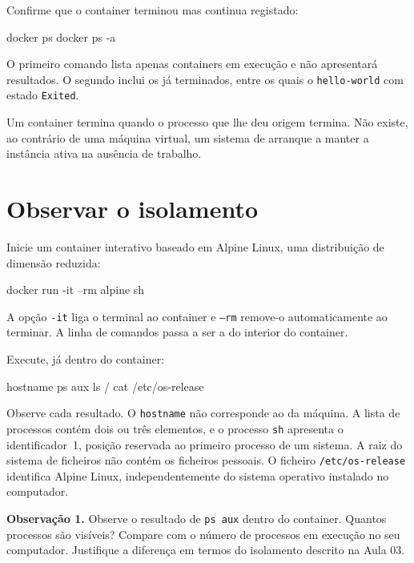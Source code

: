 \documentclass[11pt,a4paper]{article}
\begin{document}
Confirme que o container terminou mas continua registado:

\begin{terminal}
docker ps
docker ps -a
\end{terminal}

O primeiro comando lista apenas containers em execução e não apresentará resultados. O segundo inclui os já terminados, entre os quais o \texttt{hello-world} com estado \texttt{Exited}.

\begin{nota}
Um container termina quando o processo que lhe deu origem termina. Não existe, ao contrário de uma máquina virtual, um sistema de arranque a manter a instância ativa na ausência de trabalho.
\end{nota}

\section{Observar o isolamento}

Inicie um container interativo baseado em Alpine Linux, uma distribuição de dimensão reduzida:

\begin{terminal}
docker run -it --rm alpine sh
\end{terminal}

A opção \texttt{-it} liga o terminal ao container e \texttt{--rm} remove-o automaticamente ao terminar. A linha de comandos passa a ser a do interior do container.

Execute, já dentro do container:

\begin{terminal}
hostname
ps aux
ls /
cat /etc/os-release
\end{terminal}

Observe cada resultado. O \texttt{hostname} não corresponde ao da máquina. A lista de processos contém dois ou três elementos, e o processo \texttt{sh} apresenta o identificador~1, posição reservada ao primeiro processo de um sistema. A raiz do sistema de ficheiros não contém os ficheiros pessoais. O ficheiro \texttt{/etc/os-release} identifica Alpine Linux, independentemente do sistema operativo instalado no computador.

\begin{registo}
\textbf{Observação 1.} Observe o resultado de \texttt{ps aux} dentro do container. Quantos processos são visíveis? Compare com o número de processos em execução no seu computador. Justifique a diferença em termos do isolamento descrito na Aula 03.
\end{registo}
\end{document}

